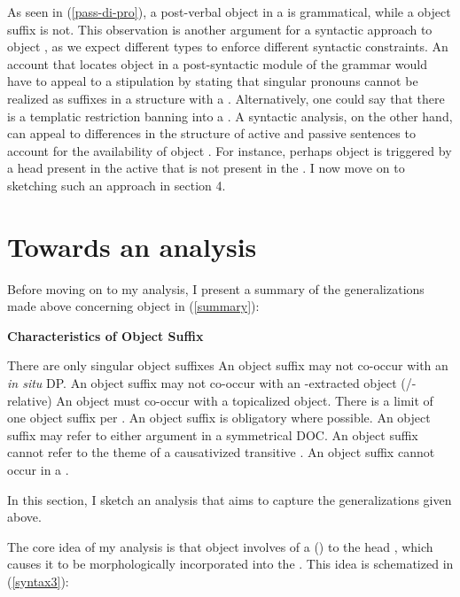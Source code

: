 \documentclass[output=paper,
modfonts
]{langscibook}
\begin{document}
\noindent As seen in (\ref{pass-di-pro}), a post-verbal object in a   is grammatical, while a object suffix is not. This observation is another argument for a syntactic approach to object , as we expect different  types to enforce different syntactic constraints. An account that locates object  in a post-syntactic module of the grammar would have to appeal to a stipulation by stating that singular pronouns cannot be realized as suffixes in a structure with a . Alternatively, one could say that there is a templatic restriction banning  into a  . A syntactic analysis, on the other hand, can appeal to differences in the structure of active and passive sentences to account for the availability of object . For instance, perhaps object  is triggered by a head present in the active that is not present in the . I now move on to sketching such an approach in section 4.

\section{Towards an analysis}\label{sec:baier:4}

Before moving on to my analysis, I present a summary of the generalizations made above concerning object  in (\ref{summary}):

\begin{exe}
\ex  \label{summary} \textbf{Characteristics of Object Suffix}
\begin{xlista}
\ex There are only singular object suffixes
\ex An object suffix may not co-occur with an \textit{in situ} DP.
\ex An object suffix may not co-occur with an \abar-extracted object (/\wh{}-relative)
\ex An object must co-occur with a topicalized object. 
\ex There is a limit of one object suffix per .
\ex An object suffix is obligatory where possible.
\ex An object suffix may refer to either argument in a symmetrical DOC.
\ex An object suffix cannot refer to the theme of a causativized transitive .  
\ex An object suffix cannot occur in a  .
\end{xlista}
\end{exe}

\noindent In this section, I sketch an analysis that aims to capture the generalizations given above.

The core idea of my analysis is that object  involves  of a  () to the head \hdzero{\lilv{}}, which causes it to be morphologically incorporated into the . This idea is schematized in (\ref{syntax3}):
\end{document}
